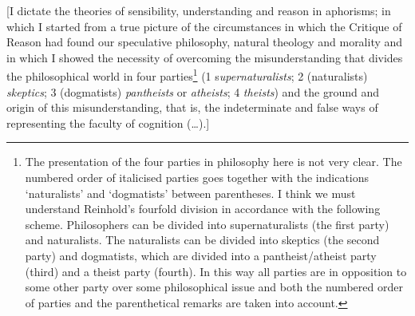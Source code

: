 [I dictate the theories of sensibility, understanding and reason in aphorisms; in which I started from a true picture of the circumstances in which the Critique of Reason had found our speculative philosophy, natural theology and morality and in which I showed the necessity of overcoming the misunderstanding that divides the philosophical world in four parties\footnote{ The presentation of the four parties in philosophy here is not very clear. The numbered order of italicised parties goes together with the indications `naturalists' and `dogmatists' between parentheses. I think we must understand Reinhold's fourfold division in accordance with the following scheme. Philosophers can be divided into supernaturalists (the first party) and naturalists. The naturalists can be divided into skeptics (the second party) and dogmatists, which are divided into a pantheist/atheist party (third) and a theist party (fourth). In this way all parties are in opposition to some other party over some philosophical issue and both the numbered order of parties and the parenthetical remarks are taken into account. } (1 s\textit{upernaturalists}; 2 (naturalists) \textit{skeptics}; 3 (dogmatists) \textit{pantheists }or \textit{atheists}; 4 \textit{theists}) and the ground and origin of this misunderstanding, that is, the indeterminate and false ways of representing the faculty of cognition (\ldots ).]                         


